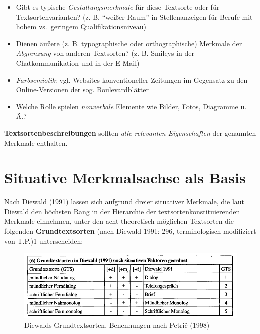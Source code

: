 \documentclass[
  letterpaper,
]{scrbook}
\providecommand{\tightlist}{%
  \setlength{\itemsep}{0pt}\setlength{\parskip}{0pt}}\usepackage{longtable,booktabs,array}
\begin{document}
\begin{itemize}
\tightlist
\item
  Gibt es typische \emph{Gestaltungsmerkmale} für diese Textsorte oder
  für Textsortenvarianten? (z. B. ``weißer Raum'' in Stellenanzeigen für
  Berufe mit hohem vs.~geringem Qualifikationsniveau)\\
\item
  Dienen äußere (z. B. typographische oder orthographische) Merkmale der
  \emph{Abgrenzung} von anderen Textsorten? (z. B. Smileys in der
  Chatkommunikation und in der E-Mail)\\
\item
  \emph{Farbsemiotik}: vgl. Websites konventioneller Zeitungen im
  Gegensatz zu den Online-Versionen der sog. Boulevardblätter\\
\item
  Welche Rolle spielen \emph{nonverbale} Elemente wie Bilder, Fotos,
  Diagramme u. Ä.?\\
\end{itemize}

\textbf{Textsortenbeschreibungen} sollten \emph{alle relevanten
Eigenschaften} der genannten Merkmale enthalten.

\hypertarget{situative-merkmalsachse-als-basis}{%
\section{Situative Merkmalsachse als
Basis}\label{situative-merkmalsachse-als-basis}}

Nach Diewald (1991) lassen sich aufgrund dreier situativer Merkmale, die
laut Diewald den höchsten Rang in der Hierarchie der
textsortenkonstituierenden Merkmale einnehmen, unter den acht
theoretisch möglichen Textsorten die folgenden \textbf{Grundtextsorten}
(nach Diewald 1991: 296, terminologisch modifiziert von T.P.)1
unterscheiden:

\begin{figure}

{\centering \includegraphics[width=1\textwidth,height=\textheight]{./pictures/Grundtextsorten_Diewald1991.png}

}

\caption{Diewalds Grundtextsorten, Benennungen nach Petrič (1998)}

\end{figure}
\end{document}
